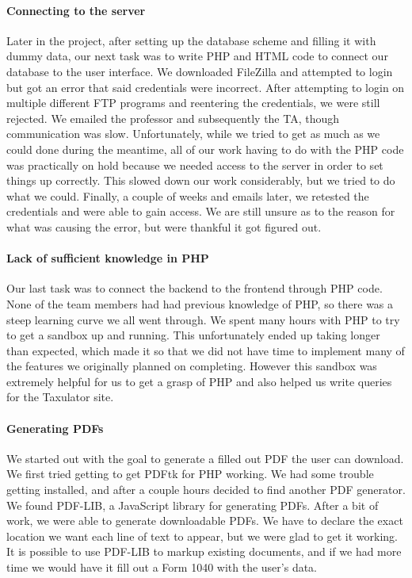\documentclass[sigconf]{acmart}
\begin{document}
\paragraph{Connecting to the server}
Later in the project, after setting up the database scheme and filling it with dummy data, our next task was to write PHP and HTML code to connect our database to the user interface. We downloaded FileZilla and attempted to login but got an error that said credentials were incorrect. After attempting to login on multiple different FTP programs and reentering the credentials, we were still rejected. We emailed the professor and subsequently the TA, though communication was slow. Unfortunately, while we tried to get as much as we could done during the meantime, all of our work having to do with the PHP code was practically on hold because we needed access to the server in order to set things up correctly. This slowed down our work considerably, but we tried to do what we could. Finally, a couple of weeks and emails later, we retested the credentials and were able to gain access. We are still unsure as to the reason for what was causing the error, but were thankful it got figured out.

\paragraph{Lack of sufficient knowledge in PHP}
Our last task was to connect the backend to the frontend through PHP code. None of the team members had had previous knowledge of PHP, so there was a steep learning curve we all went through. We spent many hours with PHP to try to get a sandbox up and running. This unfortunately ended up taking longer than expected, which made it so that we did not have time to implement many of the features we originally planned on completing. However this sandbox \cite{Sandbox} was extremely helpful for us to get a grasp of PHP and also helped us write queries for the Taxulator site.

\paragraph{Generating PDFs}
We started out with the goal to generate a filled out PDF the user can download. We first tried getting to get PDFtk for PHP working. We had some trouble getting installed, and after a couple hours decided to find another PDF generator. We found PDF-LIB, a JavaScript library for generating PDFs. After a bit of work, we were able to generate downloadable PDFs. We have to declare the exact location we want each line of text to appear, but we were glad to get it working. It is possible to use PDF-LIB to markup existing documents, and if we had more time we would have it fill out a Form 1040 with the user's data.
\end{document}
